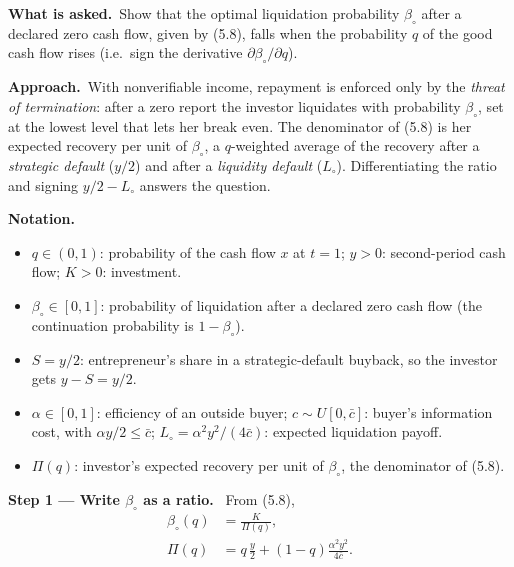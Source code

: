 \documentclass[11pt,a4paper]{article}
\newcommand{\notation}{\par\noindent\textbf{Notation.}}
\newcommand{\step}[2]{\par\medskip\noindent\textbf{Step #1 --- #2.}~}
\newcommand{\asked}{\par\medskip\noindent\textbf{What is asked.}~}
\newcommand{\approach}{\par\smallskip\noindent\textbf{Approach.}~}
\begin{document}
\asked Show that the optimal liquidation probability $\beta_\circ$ after a declared zero cash flow,
given by (5.8), falls when the probability $q$ of the good cash flow rises (i.e.\ sign the derivative
$\partial\beta_\circ/\partial q$).

\approach With nonverifiable income, repayment is enforced only by the \emph{threat of termination}:
after a zero report the investor liquidates with probability $\beta_\circ$, set at the lowest level that
lets her break even. The denominator of (5.8) is her expected recovery per unit of $\beta_\circ$, a
$q$-weighted average of the recovery after a \emph{strategic default} ($y/2$) and after a \emph{liquidity
default} ($L_\circ$). Differentiating the ratio and signing $y/2-L_\circ$ answers the question.

\notation
\begin{itemize}
  \item $q\in(0,1)$: probability of the cash flow $x$ at $t=1$; $y>0$: second-period cash flow; $K>0$: investment.
  \item $\beta_\circ\in[0,1]$: probability of liquidation after a declared zero cash flow (the continuation probability is $1-\beta_\circ$).
  \item $S=y/2$: entrepreneur's share in a strategic-default buyback, so the investor gets $y-S=y/2$.
  \item $\alpha\in[0,1]$: efficiency of an outside buyer; $c\sim U[0,\bar c]$: buyer's information cost, with $\alpha y/2\leq\bar c$; $L_\circ=\alpha^2y^2/(4\bar c)$: expected liquidation payoff.
  \item $\Pi(q)$: investor's expected recovery per unit of $\beta_\circ$, the denominator of (5.8).
\end{itemize}

\step{1}{Write $\beta_\circ$ as a ratio} From (5.8),
\begin{align}
  \beta_\circ(q) &= \frac{K}{\Pi(q)}, \label{t5e3-beta}\\
  \Pi(q) &= q\,\frac{y}{2}+(1-q)\frac{\alpha^2y^2}{4\bar c}. \label{t5e3-Pi}
\end{align}
\end{document}
